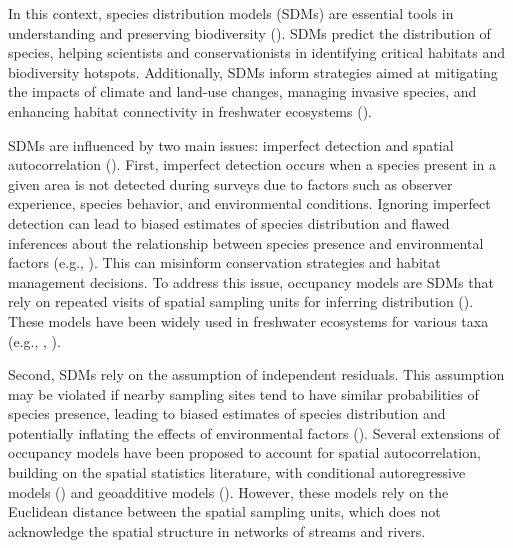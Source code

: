 \documentclass[
  11pt,
  a4paper,
]{article}
\begin{document}
In this context, species distribution models (SDMs) are essential tools in understanding and preserving biodiversity (). SDMs predict the distribution of species, helping scientists and conservationists in identifying critical habitats and biodiversity hotspots. Additionally, SDMs inform strategies aimed at mitigating the impacts of climate and land-use changes, managing invasive species, and enhancing habitat connectivity in freshwater ecosystems ().

SDMs are influenced by two main issues: imperfect detection and spatial autocorrelation (). First, imperfect detection occurs when a species present in a given area is not detected during surveys due to factors such as observer experience, species behavior, and environmental conditions. Ignoring imperfect detection can lead to biased estimates of species distribution and flawed inferences about the relationship between species presence and environmental factors (e.g., ). This can misinform conservation strategies and habitat management decisions. To address this issue, occupancy models are SDMs that rely on repeated visits of spatial sampling units for inferring distribution (). These models have been widely used in freshwater ecosystems for various taxa (e.g., , ).

Second, SDMs rely on the assumption of independent residuals. This assumption may be violated if nearby sampling sites tend to have similar probabilities of species presence, leading to biased estimates of species distribution and potentially inflating the effects of environmental factors (). Several extensions of occupancy models have been proposed to account for spatial autocorrelation, building on the spatial statistics literature, with conditional autoregressive models () and geoadditive models (). However, these models rely on the Euclidean distance between the spatial sampling units, which does not acknowledge the spatial structure in networks of streams and rivers.
\end{document}
